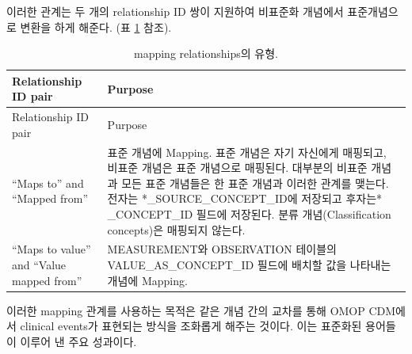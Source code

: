 \documentclass[11pt]{book}
\theoremstyle{definition}
\theoremstyle{definition}
\theoremstyle{definition}
\theoremstyle{remark}
\begin{document}
이러한 관계는 두 개의 relationship ID 쌍이 지원하여 비표준화 개념에서
표준개념으로 변환을 하게 해준다. (표 \ref{tab:mappingRelationships}
참조). 

\begin{longtable}[]{@{}ll@{}}
\caption{\label{tab:mappingRelationships} mapping relationships의
유형.}\tabularnewline
\toprule
\begin{minipage}[b]{0.20\columnwidth}\raggedright\strut
Relationship ID pair\strut
\end{minipage} & \begin{minipage}[b]{0.71\columnwidth}\raggedright\strut
Purpose\strut
\end{minipage}\tabularnewline
\midrule
\endfirsthead
\toprule
\begin{minipage}[b]{0.20\columnwidth}\raggedright\strut
Relationship ID pair\strut
\end{minipage} & \begin{minipage}[b]{0.71\columnwidth}\raggedright\strut
Purpose\strut
\end{minipage}\tabularnewline
\midrule
\endhead
\begin{minipage}[t]{0.20\columnwidth}\raggedright\strut
``Maps to'' and ``Mapped from''\strut
\end{minipage} & \begin{minipage}[t]{0.71\columnwidth}\raggedright\strut
표준 개념에 Mapping. 표준 개념은 자기 자신에게 매핑되고, 비표준 개념은
표준 개념으로 매핑된다. 대부분의 비표준 개념과 모든 표준 개념들은 한
표준 개념과 이러한 관계를 맺는다. 전자는 *\_SOURCE\_CONCEPT\_ID에
저장되고 후자는* \_CONCEPT\_ID 필드에 저장된다. 분류 개념(Classification
concepts)은 매핑되지 않는다.\strut
\end{minipage}\tabularnewline
\begin{minipage}[t]{0.20\columnwidth}\raggedright\strut
``Maps to value'' and ``Value mapped from''\strut
\end{minipage} & \begin{minipage}[t]{0.71\columnwidth}\raggedright\strut
MEASUREMENT와 OBSERVATION 테이블의 VALUE\_AS\_CONCEPT\_ID 필드에 배치할
값을 나타내는 개념에 Mapping.\strut
\end{minipage}\tabularnewline
\bottomrule
\end{longtable}

이러한 mapping 관계를 사용하는 목적은 같은 개념 간의 교차를 통해 OMOP
CDM에서 clinical events가 표현되는 방식을 조화롭게 해주는 것이다. 이는
표준화된 용어들이 이루어 낸 주요 성과이다.
\end{document}
